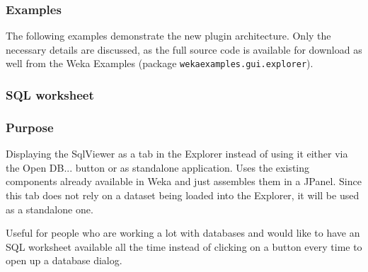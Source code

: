 \subsubsection{Examples}
The following examples demonstrate the new plugin architecture. Only the
necessary details are discussed, as the full source code is available for
download as well from the Weka Examples \cite{wekaexamples} (package
\texttt{wekaexamples.gui.explorer}).

\subsubsection*{SQL worksheet}
\subsubsection*{Purpose}
Displaying the SqlViewer as a tab in the Explorer instead of using it either via
the Open DB... button or as standalone application. Uses the existing components
already available in Weka and just assembles them in a JPanel. Since this tab
does not rely on a dataset being loaded into the Explorer, it will be used as a
standalone one.

Useful for people who are working a lot with databases and would like to have an
SQL worksheet available all the time instead of clicking on a button every time
to open up a database dialog.

